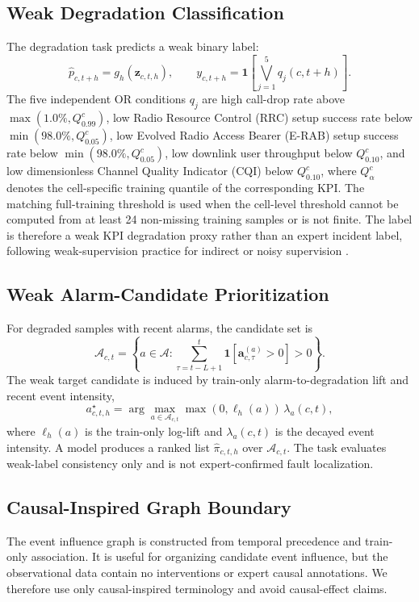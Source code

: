 \subsection{Weak Degradation Classification}
The degradation task predicts a weak binary label:
\begin{equation}
    \hat{p}_{c,t+h}=g_h(\mathbf{z}_{c,t,h}),\qquad
    y_{c,t+h}=\mathbf{1}\left[\bigvee_{j=1}^{5} q_j(c,t+h)\right].
\end{equation}
The five independent OR conditions $q_j$ are high call-drop rate above $\max(1.0\%,Q^{c}_{0.99})$, low Radio Resource Control (RRC) setup success rate below $\min(98.0\%,Q^{c}_{0.05})$, low Evolved Radio Access Bearer (E-RAB) setup success rate below $\min(98.0\%,Q^{c}_{0.05})$, low downlink user throughput below $Q^{c}_{0.10}$, and low dimensionless Channel Quality Indicator (CQI) below $Q^{c}_{0.10}$, where $Q^{c}_{\alpha}$ denotes the cell-specific training quantile of the corresponding KPI. The matching full-training threshold is used when the cell-level threshold cannot be computed from at least 24 non-missing training samples or is not finite. The label is therefore a weak KPI degradation proxy rather than an expert incident label, following weak-supervision practice for indirect or noisy supervision \cite{zhou2018weakly,ratner2020snorkel}.

\subsection{Weak Alarm-Candidate Prioritization}
For degraded samples with recent alarms, the candidate set is
\begin{equation}
    \mathcal{A}_{c,t}=\left\{a\in\mathcal{A}:\sum_{\tau=t-L+1}^{t}
    \mathbf{1}[\mathbf{a}_{c,\tau}^{(a)}>0]>0\right\}.
\end{equation}
The weak target candidate is induced by train-only alarm-to-degradation lift and recent event intensity,
\begin{equation}
    a^{\star}_{c,t,h}=\arg\max_{a\in\mathcal{A}_{c,t}}
    \max(0,\ell_h(a))\,\lambda_a(c,t),
\end{equation}
where $\ell_h(a)$ is the train-only log-lift and $\lambda_a(c,t)$ is the decayed event intensity. A model produces a ranked list $\widehat{\pi}_{c,t,h}$ over $\mathcal{A}_{c,t}$. The task evaluates weak-label consistency only and is not expert-confirmed fault localization.

\subsection{Causal-Inspired Graph Boundary}
The event influence graph is constructed from temporal precedence and train-only association. It is useful for organizing candidate event influence, but the observational data contain no interventions or expert causal annotations. We therefore use only causal-inspired terminology and avoid causal-effect claims.
